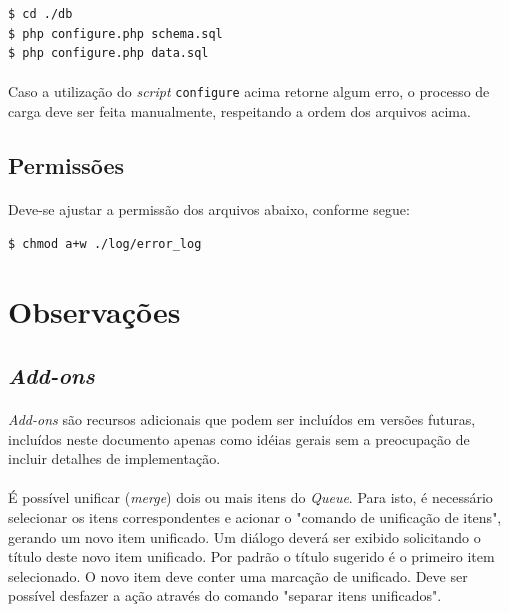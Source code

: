 \documentclass[a4paper,12pt]{article}
\def\queue{\emph{Queue}}
\begin{document}
\begin{verbatim}
$ cd ./db
$ php configure.php schema.sql
$ php configure.php data.sql
\end{verbatim}

\paragraph{}
Caso a utilização do \emph{script} \texttt{configure} acima retorne algum erro, o processo de carga deve ser feita manualmente, respeitando a ordem dos arquivos acima.

\subsection{Permissões}

\paragraph{}
Deve-se ajustar a permissão dos arquivos abaixo, conforme segue:

\begin{verbatim}
$ chmod a+w ./log/error_log
\end{verbatim}

\appendix

\section{Observações}

\subsection{\emph{Add-ons}}

\paragraph{}
\emph{Add-ons} são recursos adicionais que podem ser incluídos em versões
futuras, incluídos neste documento apenas como idéias gerais sem a preocupação
de incluir detalhes de implementação.

\paragraph{}
É possível unificar (\emph{merge}) dois ou mais itens do \queue{}. Para isto, é
necessário selecionar os itens correspondentes e acionar o "comando de
unificação de itens", gerando um novo item unificado. Um diálogo deverá ser
exibido solicitando o título deste novo item unificado. Por padrão o título
sugerido é o primeiro item selecionado. O novo item deve conter uma marcação de
unificado. Deve ser possível desfazer a ação através do comando "separar itens
unificados".
\end{document}
